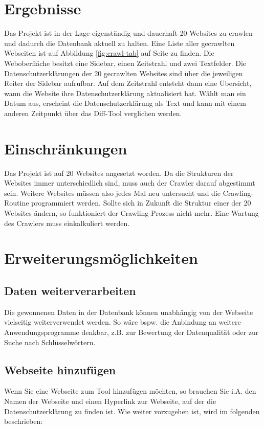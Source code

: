 \documentclass{article}
\begin{document}
	
	\section{Ergebnisse} 
	
	Das Projekt ist in der Lage eigenständig und dauerhaft 20 Websites zu crawlen und dadurch die Datenbank aktuell zu halten. Eine Liste aller gecrawlten Webseiten ist auf Abbildung \ref{fig:crawl-tab} auf Seite \pageref{fig:crawl-tab} zu finden.
	\newline
	Die Weboberfläche besitzt eine Sidebar, einen Zeitstrahl und zwei Textfelder. Die Datenschutzerklärungen der 20 gecrawlten Websites sind über die jeweiligen Reiter der Sidebar aufrufbar. Auf dem Zeitstrahl entsteht dann eine Übersicht, wann die Website ihre Datenschutzerklärung aktualisiert hat. Wählt man ein Datum aus, erscheint die Datenschutzerklärung als Text und kann mit einem anderen Zeitpunkt über das Diff-Tool verglichen werden.
	
	\section{Einschränkungen}
	Das Projekt ist auf 20 Websites angesetzt worden. Da die Strukturen der Websites immer unterschiedlich sind, muss auch der Crawler darauf abgestimmt sein. Weitere Websites müssen also jedes Mal neu untersucht und die Crawling-Routine programmiert werden.\newline
	Sollte sich in Zukunft die Struktur einer der 20 Websites ändern, so funktioniert der Crawling-Prozess nicht mehr. Eine Wartung des Crawlers muss einkalkuliert werden.
	\section{Erweiterungsmöglichkeiten}
	\subsection{Daten weiterverarbeiten}
	Die gewonnenen Daten in der Datenbank können unabhängig von der Webseite vielseitig weiterverwendet werden. So wäre bspw. die Anbindung an weitere Anwendungsprogramme denkbar, z.B. zur Bewertung der Datenqualität oder zur Suche nach Schlüsselwörtern.
	\subsection{Webseite hinzufügen}
	\label{sec:add-site}
	Wenn Sie eine Webseite zum Tool hinzufügen möchten, so brauchen Sie i.A. den Namen der Webseite und einen Hyperlink zur Webseite, auf der die Datenschutzerklärung zu finden ist. Wie weiter vorzugehen ist, wird im folgenden beschrieben:
\end{document}
